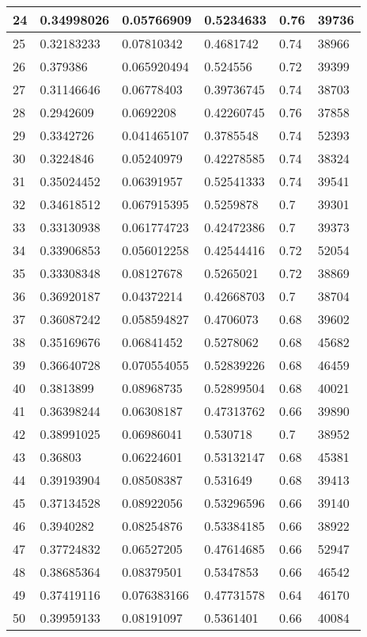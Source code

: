 \begin{longtable}{|l|l|l|l|l|l|}
24 & 0.34998026 & 0.05766909 & 0.5234633 & 0.76 & 39736 \\ \hline 
25 & 0.32183233 & 0.07810342 & 0.4681742 & 0.74 & 38966 \\ \hline 
26 & 0.379386 & 0.065920494 & 0.524556 & 0.72 & 39399 \\ \hline 
27 & 0.31146646 & 0.06778403 & 0.39736745 & 0.74 & 38703 \\ \hline 
28 & 0.2942609 & 0.0692208 & 0.42260745 & 0.76 & 37858 \\ \hline 
29 & 0.3342726 & 0.041465107 & 0.3785548 & 0.74 & 52393 \\ \hline 
30 & 0.3224846 & 0.05240979 & 0.42278585 & 0.74 & 38324 \\ \hline 
31 & 0.35024452 & 0.06391957 & 0.52541333 & 0.74 & 39541 \\ \hline 
32 & 0.34618512 & 0.067915395 & 0.5259878 & 0.7 & 39301 \\ \hline 
33 & 0.33130938 & 0.061774723 & 0.42472386 & 0.7 & 39373 \\ \hline 
34 & 0.33906853 & 0.056012258 & 0.42544416 & 0.72 & 52054 \\ \hline 
35 & 0.33308348 & 0.08127678 & 0.5265021 & 0.72 & 38869 \\ \hline 
36 & 0.36920187 & 0.04372214 & 0.42668703 & 0.7 & 38704 \\ \hline 
37 & 0.36087242 & 0.058594827 & 0.4706073 & 0.68 & 39602 \\ \hline 
38 & 0.35169676 & 0.06841452 & 0.5278062 & 0.68 & 45682 \\ \hline 
39 & 0.36640728 & 0.070554055 & 0.52839226 & 0.68 & 46459 \\ \hline 
40 & 0.3813899 & 0.08968735 & 0.52899504 & 0.68 & 40021 \\ \hline 
41 & 0.36398244 & 0.06308187 & 0.47313762 & 0.66 & 39890 \\ \hline 
42 & 0.38991025 & 0.06986041 & 0.530718 & 0.7 & 38952 \\ \hline 
43 & 0.36803 & 0.06224601 & 0.53132147 & 0.68 & 45381 \\ \hline 
44 & 0.39193904 & 0.08508387 & 0.531649 & 0.68 & 39413 \\ \hline 
45 & 0.37134528 & 0.08922056 & 0.53296596 & 0.66 & 39140 \\ \hline 
46 & 0.3940282 & 0.08254876 & 0.53384185 & 0.66 & 38922 \\ \hline 
47 & 0.37724832 & 0.06527205 & 0.47614685 & 0.66 & 52947 \\ \hline 
48 & 0.38685364 & 0.08379501 & 0.5347853 & 0.66 & 46542 \\ \hline 
49 & 0.37419116 & 0.076383166 & 0.47731578 & 0.64 & 46170 \\ \hline 
50 & 0.39959133 & 0.08191097 & 0.5361401 & 0.66 & 40084 \\ \hline 
\end{longtable}